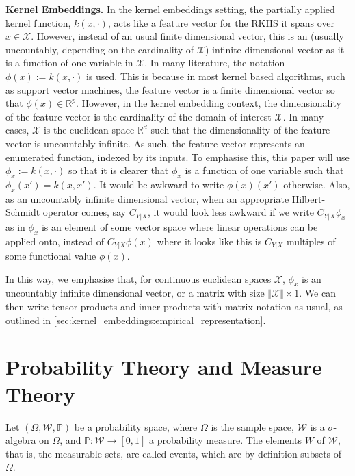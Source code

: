 \documentclass[twoside]{article} \usepackage{aistats2017}
\theoremstyle{definition}
\newcommand{\rv}[1]{{#1}}
\newcommand{\cardX}{\Vert \mathcal{X} \Vert}
\begin{document}
	\textbf{Kernel Embeddings.} In the kernel embeddings setting, the partially applied kernel function, $k(x, \cdot)$, acts like a feature vector for the RKHS it spans over $x \in \mathcal{X}$. However, instead of an usual finite dimensional vector, this is an (usually uncountably, depending on the cardinality of $\mathcal{X}$) infinite dimensional vector as it is a function of one variable in $\mathcal{X}$. In many literature, the notation $\phi(x) := k(x, \cdot)$ is used. This is because in most kernel based algorithms, such as support vector machines, the feature vector is a finite dimensional vector so that $\phi(x) \in \mathbb{R}^{p}$. However, in the kernel embedding context, the dimensionality of the feature vector is the cardinality of the domain of interest $\mathcal{X}$. In many cases, $\mathcal{X}$ is the euclidean space $\mathbb{R}^{d}$ such that the dimensionality of the feature vector is uncountably infinite. As such, the feature vector represents an enumerated function, indexed by its inputs. To emphasise this, this paper will use $\phi_{x} := k(x, \cdot)$ so that it is clearer that $\phi_{x}$ is a function of one variable such that $\phi_{x}(x') = k(x, x')$. It would be awkward to write $\phi(x)(x')$ otherwise. Also, as an uncountably infinite dimensional vector, when an appropriate Hilbert-Schmidt operator comes, say $C_{\rv{Y} | \rv{X}}$, it would look less awkward if we write $C_{\rv{Y} | \rv{X}} \phi_{x}$ as in $\phi_{x}$ is an element of some vector space where linear operations can be applied onto, instead of $C_{\rv{Y} | \rv{X}} \phi(x)$ where it looks like this is $C_{\rv{Y} | \rv{X}}$ multiples of some functional value $\phi(x)$.
	
	In this way, we emphasise that, for continuous euclidean spaces $\mathcal{X}$, $\phi_{x}$ is an uncountably infinite dimensional vector, or a matrix with size $\cardX \times 1$. We can then write tensor products and inner products with matrix notation as usual, as outlined in \cref{sec:kernel_embeddings:empirical_representation}.
	
\section{Probability Theory and Measure Theory}
\label{sec:probability_theory}

	Let $(\Omega, \mathcal{W}, \mathbb{P})$ be a probability space, where $\Omega$ is the sample space, $\mathcal{W}$ is a $\sigma$-algebra on $\Omega$, and $\mathbb{P} : \mathcal{W} \to [0, 1]$ a probability measure. The elements $W$ of $\mathcal{W}$, that is, the measurable sets, are called events, which are by definition subsets of $\Omega$.
	
\end{document}
